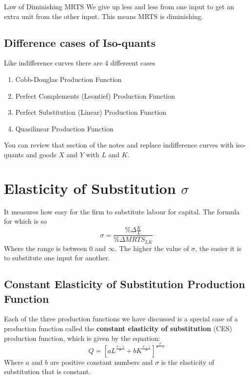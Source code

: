 \documentclass[../ECON-281-Notes.tex]{subfiles}
\begin{document}
\begin{Theorem}
    {Law of Diminishing MRTS}
    We give up less and less from one input to get an extra unit from the other input. This means MRTS is diminishing. 
\end{Theorem}

\subsection{Difference cases of Iso-quants}
Like indifference curves there are 4 differeent cases
\begin{enumerate}
    \item Cobb-Douglas Production Function
    \item Perfect Complements (Leontief) Production Function
    \item Perfect Substitution (Linear) Production Function 
    \item Quasilinear Production Function 
\end{enumerate}
You can review that section of the notes and replace indifference curves with iso-quants and goods \(X\) and \(Y\) with \(L\) and \(K\).
\section{Elasticity of Substitution \(\sigma\) } 
It measures how easy for the firm to substitute labour for capital. 
The formula for which is so 
\begin{equation}
    \sigma = \frac{\% \Delta \frac{K}{L}}{\% \Delta MRTS_{LK}}
\end{equation} 
Where the range is between \(0\) and \(\infty\).
The higher the value of \(\sigma\), the easier it is to substitute one input for another. 

\subsection{Constant Elasticity of Substitution Production Function}
Each of the three production functions we have discussed is a special case of a production function called the \textbf{constant elasticity of substitution} (CES) production function, which is given by the equation:
\begin{equation}
    Q = [aL^{\frac{\sigma - 1}{\sigma}} + bK^{\frac{\sigma - 1}{\sigma}} ]^{\frac{\sigma}{\sigma - 1}} 
\end{equation}
Where \(a\) and \(b\) are positive constant numbers and \(\sigma\) is the elasticity of substitution that is constant.
\end{document}
